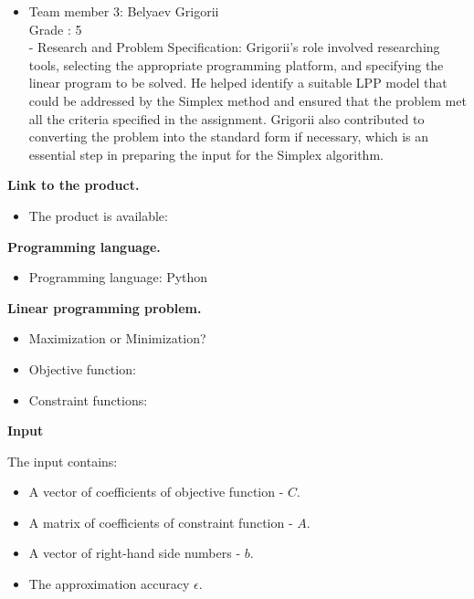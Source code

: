 \documentclass[12pt, legalpaper]{exam}
\begin{document}
\begin{itemize}
    \item Team member 3: Belyaev Grigorii
    \\ Grade : 5
    \\- Research and Problem Specification: Grigorii's role involved researching tools, selecting the appropriate programming platform, and specifying the linear program to be solved. He helped identify a suitable LPP model that could be addressed by the Simplex method and ensured that the problem met all the criteria specified in the assignment. Grigorii also contributed to converting the problem into the standard form if necessary, which is an essential step in preparing the input for the Simplex algorithm.
\end{itemize}
\vspace{12pt}
\noindent     \textbf{Link to the product.}
\begin{itemize}
    \item The product is available:  
\end{itemize}

\vspace{12pt}

\noindent  \textbf{Programming language.}
\begin{itemize}
    \item Programming language:  Python
\end{itemize}

\vspace{12pt}

\noindent  \textbf{Linear programming problem.}
\begin{itemize}
\item Maximization or Minimization?
\vspace{10pt}
    \item Objective function:
    \vspace{10pt}
    \item Constraint functions:
    \vspace{5cm}
\end{itemize}



\noindent     \textbf{Input}

\vspace{12pt}
The input contains:
\begin{itemize}
    \item A vector of coefficients of objective function - $C$.
    \item A matrix of coefficients of constraint function - $A$.
    \item A vector of right-hand side numbers - $b$.
    \item The approximation accuracy $\epsilon$.
\end{itemize}
\end{document}
